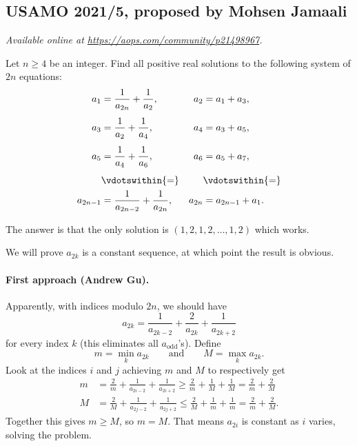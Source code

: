 \documentclass[11pt]{scrartcl}
\begin{document}
\subsection{USAMO 2021/5, proposed by Mohsen Jamaali}
\textsl{Available online at \url{https://aops.com/community/p21498967}.}
\begin{mdframed}[style=mdpurplebox,frametitle={Problem statement}]
Let $n \ge 4$ be an integer.
Find all positive real solutions to the following
system of $2n$ equations:
\begin{align*}
  a_1 &= \frac{1}{a_{2n}} + \frac{1}{a_{2}}, & a_2 &= a_1 + a_3, \\[1ex]
  a_3 &= \frac{1}{a_{2}} + \frac{1}{a_{4}}, & a_4 &= a_3 + a_5, \\[1ex]
  a_5 &= \frac{1}{a_{4}} + \frac{1}{a_{6}}, & a_6 &= a_5 + a_7, \\[1ex]
  &\vdotswithin{=} &&\vdotswithin{=} \\
  a_{2n-1} &= \frac{1}{a_{2n-2}} + \frac{1}{a_{2n}}, & a_{2n} &= a_{2n-1} + a_1.
\end{align*}
\end{mdframed}
The answer is that the only solution is
$(1,2,1,2,\dots,1,2)$ which works.

We will prove $a_{2k}$ is a constant sequence,
at which point the result is obvious.

\paragraph{First approach (Andrew Gu).}
Apparently, with indices modulo $2n$, we should have
\[ a_{2k} = \frac{1}{a_{2k-2}}
  + \frac{2}{a_{2k}} + \frac{1}{a_{2k+2}} \]
for every index $k$ (this eliminates all $a_{\text{odd}}$'s).
Define
\[ m = \min_k a_{2k} \qquad\text{and}\qquad M = \max_k a_{2k}. \]
Look at the indices $i$ and $j$
achieving $m$ and $M$ to respectively get
\begin{align*}
  m &= \frac2m + \frac{1}{a_{2i-2}} + \frac{1}{a_{2i+2}}
  \ge \frac2m + \frac1M + \frac1M  = \frac2m + \frac2M \\[1ex]
  M &= \frac2M + \frac{1}{a_{2j-2}} + \frac{1}{a_{2j+2}}
  \le \frac2M + \frac1m + \frac1m = \frac2m + \frac2M.
\end{align*}
Together this gives $m \ge M$, so $m = M$.
That means $a_{2i}$ is constant as $i$ varies,
solving the problem.
\end{document}

